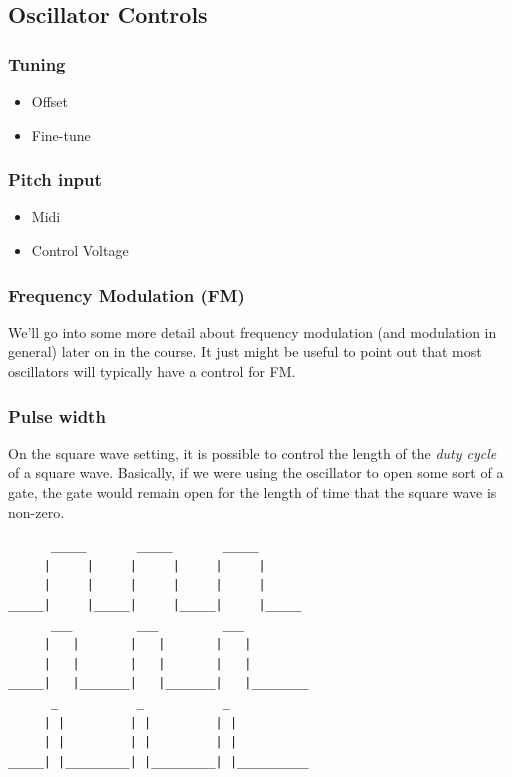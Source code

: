 \documentclass[11pt]{article}
\begin{document}
\subsection{Oscillator Controls}
\label{sec:org5445ad9}
\subsubsection{Tuning}
\label{sec:org21b5718}
\begin{itemize}
\item Offset
\item Fine-tune
\end{itemize}

\subsubsection{Pitch input}
\label{sec:orge044e3a}
\begin{itemize}
\item Midi
\item Control Voltage
\end{itemize}

\subsubsection{Frequency Modulation (FM)}
\label{sec:org94a0943}
We'll go into some more detail about frequency modulation (and
modulation in general) later on in the course. It just might be
useful to point out that most oscillators will typically have a
control for FM.

\subsubsection{Pulse width}
\label{sec:orgd3411b0}
On the square wave setting, it is possible to control the length of
the \emph{duty cycle} of a square wave. Basically, if we were using the
oscillator to open some sort of a gate, the gate would remain open for
the length of time that the square wave is non-zero. 

\begin{verbatim}
      _____       _____       _____
     |     |     |     |     |     |
     |     |     |     |     |     |
_____|     |_____|     |_____|     |_____
      ___         ___         ___
     |   |       |   |       |   |
     |   |       |   |       |   |
_____|   |_______|   |_______|   |________
      _           _           _
     | |         | |         | |
     | |         | |         | |
_____| |_________| |_________| |__________

\end{verbatim}
\end{document}
